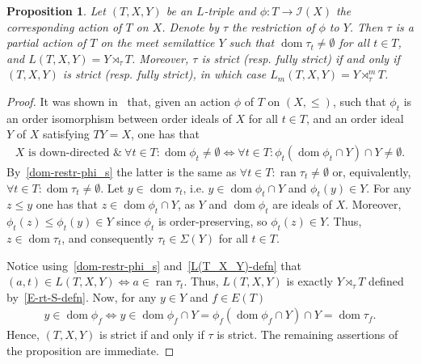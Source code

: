 \documentclass[reqno]{amsart}
\newtheorem{prop}[thrm]{Proposition}
\theoremstyle{definition}
\renewcommand{\iff}{\Leftrightarrow}
\newcommand{\cI}[1]{\mathcal I{(#1)}}
\newcommand{\Sg}[1]{\Sigma{(#1)}}
\newcommand{\dom}[1]{\operatorname{\mathrm{dom}}{#1}}
\newcommand{\ran}[1]{\operatorname{\mathrm{ran}}{#1}}
\newcommand{\0}{\theta}
\newcommand{\rt}{\rtimes}
\begin{document}
\begin{prop}\label{from-L-triple-to-part-act}
	Let $(T,X,Y)$ be an $L$-triple and $\phi:T\to\cI X$ the corresponding action of $T$ on $X$. Denote by $\tau$ the restriction of $\phi$ to $Y$. Then $\tau$ is a partial action of $T$ on the meet semilattice $Y$ such that $\dom{\tau_t}\ne\emptyset$ for all $t\in T$, and $L(T,X,Y)=Y\rt_\tau T$. Moreover, $\tau$ is strict (resp. fully strict) if and only if $(T,X,Y)$ is strict (resp. fully strict), in which case $L_m(T,X,Y)=Y\rt_\tau^m T$.
\end{prop}
\begin{proof}
	It was shown in~\cite[Lemma~3]{O'Carroll76} that, given an action $\phi$ of $T$ on $(X,\le)$, such that $\phi_t$ is an order isomorphism between order ideals of $X$ for all $t\in T$, and an order ideal $Y$ of $X$ satisfying $TY=X$, one has that
	\begin{align}\label{X-down-dir<=>dom-tau_t-non-empty}
	X\mbox{ is down-directed }\&\ \forall t\in T:\dom\phi_t\ne\emptyset\iff\forall t\in T:\phi_t(\dom\phi_t\cap Y)\cap Y\ne\emptyset.
	\end{align}
	By~\eqref{dom-restr-phi_s} the latter is the same as $\forall t\in T:\ran{\tau_t}\ne\emptyset$ or, equivalently, $\forall t\in T:\dom{\tau_t}\ne\emptyset$. Let $y\in\dom{\tau_t}$, i.e. $y\in\dom{\phi_t}\cap Y$ and $\phi_t(y)\in Y$. For any $z\le y$ one has that $z\in\dom{\phi_t}\cap Y$, as $Y$ and $\dom{\phi_t}$ are ideals of $X$. Moreover, $\phi_t(z)\le \phi_t(y)\in Y$  since $\phi_t$ is order-preserving, so $\phi_t(z)\in Y$. Thus, $z\in\dom{\tau_t}$, and consequently $\tau_t\in\Sg{Y}$ for all $t\in T$.
	
	Notice using~\eqref{dom-restr-phi_s} and~\eqref{L(T_X_Y)-defn} that $(a,t)\in L(T,X,Y)\iff a\in \ran{\tau_t}$. Thus, $L(T,X,Y)$ is exactly $Y\rt_\tau T$ defined by~\eqref{E-rt-S-defn}. Now, for any $y\in Y$ and $f\in E(T)$
	\begin{align*}
	y\in\dom{\phi_f}\iff y\in\dom{\phi_f}\cap Y=\phi_f(\dom{\phi_f}\cap Y)\cap Y=\dom{\tau_f}.	
	\end{align*}
	Hence, $(T,X,Y)$ is strict if and only if $\tau$ is strict. The remaining assertions of the proposition are immediate. 
\end{proof}
\end{document}

